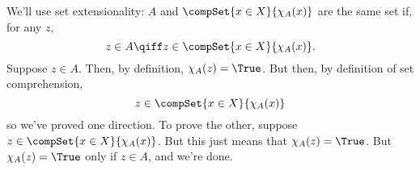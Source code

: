 We'll use set extensionality: $A$ and $\compSet{x\in X}{\chi_A(x)}$ are the same set if, for any $z$,
    \[ z\in A \qiff z\in\compSet{x\in X}{\chi_A(x)}. \]
Suppose $z\in A$. Then, by definition, $\chi_A(z)=\True$. But then, by definition of set comprehension,
    \[ z\in\compSet{x\in X}{\chi_A(x)} \]
so we've proved one direction. To prove the other, suppose $z\in\compSet{x\in X}{\chi_A(x)}$. But this just means that $\chi_A(z)=\True$. But $\chi_A(z)=\True$ only if $z\in A$, and we're done.

